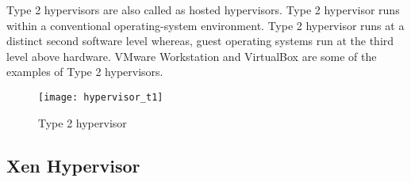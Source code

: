 \begin{description}
\item Type 2 hypervisors are also called as hosted hypervisors. Type 2 hypervisor runs within a conventional operating-system environment. Type 2 hypervisor runs at a distinct second software level whereas, guest operating systems run at the third level above hardware. VMware Workstation and VirtualBox are some of the examples of Type 2 hypervisors\cite{Sugerman:2001:VID:647055.715774, citeulike:3149886}.
\end{description}
\begin{figure}[!ht]
\centering
\texttt{[image: hypervisor\_t1]}
\caption{Type 2 hypervisor}
\label{Type 2 hypervisor}
\end{figure}

\subsection{Xen Hypervisor}

